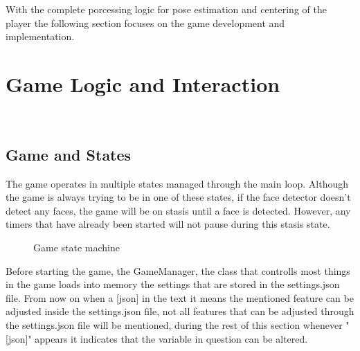 \documentclass[12pt]{article}
\begin{document}
With the complete porcessing logic for pose estimation and centering of the
player the following section focuses on the game development and
implementation.

\section{Game Logic and Interaction}~\label{sec:Game Logic and Interaction}

\subsection{Game and States}

The game operates in multiple states managed through the main loop. Although
the game is always trying to be in one of these states, if the face detector
doesn't detect any faces, the game will be on stasis until a face is detected.
However, any timers that have already been started will not pause during this
stasis state.

\begin{figure}[H]
    \centering
    \caption{Game state machine}
    \label{fig:game_states}
\end{figure}

Before starting the game, the GameManager, the class that controlls most things
in the game loads into memory the settings that are stored in the settings.json
file. From now on when a [json] in the text it means the mentioned feature can
be adjusted inside the settings.json file, not all features that can be
adjusted through the settings.json file will be mentioned, during the rest of this section whenever "[json]" appears it indicates that the variable in question can be altered.
\end{document}
